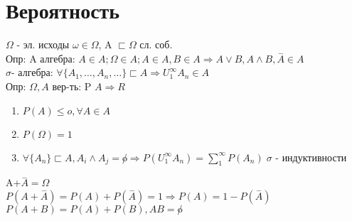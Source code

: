 \documentclass[12pt]{article}
\begin{document}
\section{Вероятность}
    $\varOmega$ - эл. исходы $\omega \in \varOmega$, A $\sqsubset \varOmega$ сл. соб.\\
    Опр: A алгебра: $A \in A; \varOmega \in A; A \in A,B \in A \Rightarrow A \lor B, A \land B, \overset{-}{A} \in A$ \\%
    $\sigma$- алгебра: $\forall \{A_1,\dots,A_n,\dots\}\sqsubset A \Rightarrow U_1^{\infty} A_n \in A$\\
    Опр: $\Omega, A$ вер-ть: P $A \Rightarrow R$\\
    \begin{enumerate}
        \item $P(A) \leq o, \forall A \in A$
        \item $P(\varOmega)=1$
        \item $\forall \{A_n\}\sqsubset A,A_i \land A_j = \not o \Rightarrow P(U_1^{\infty}A_n)=\sum_{1}^{\infty}
        P(A_n) \; \sigma$ - индуктивности
    \end{enumerate}
    A+$\overset{-}{A}=\varOmega$\\
    $P(A+\overset{-}{A})=P(A)+P(\overset{-}{A})=1 \Rightarrow P(A)=1-P(\overset{-}{A})$\\
    $P(A+B)=P(A)+P(B),AB=\not o$
\end{document}
